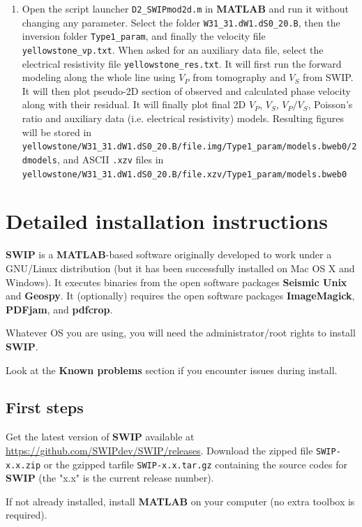 \documentclass[twoside,a4paper]{article}
\def\SWIP{\textbf{SWIP}}
\def\SeismicUnix{\textbf{Seismic Unix}}
\def\Geopsy{\textbf{Geospy}}
\def\ImageMagick{\textbf{ImageMagick}}
\def\PDFjam{\textbf{PDFjam}}
\def\pdfcrop{\textbf{pdfcrop}}
\def\MATLAB{\textbf{MATLAB}}
\begin{document}
\begin{enumerate}[leftmargin=*]
\item Open the script launcher \verb|D2_SWIPmod2d.m| in {\MATLAB} and run it without changing any parameter. Select the folder \verb|W31_31.dW1.dS0_20.B|, then the inversion folder \verb|Type1_param|, and finally the velocity file \verb|yellowstone_vp.txt|. When asked for an auxiliary data file, select the electrical resistivity file \verb|yellowstone_res.txt|. It will first run the forward modeling along the whole line using $V_P$ from tomography and $V_S$ from SWIP. It will then plot pseudo-2D section of observed and calculated phase velocity along with their residual. It will finally plot final 2D $V_P$, $V_S$, $V_P/V_S$, Poisson's ratio and auxiliary data (i.e. electrical resistivity) models. Resulting figures will be stored in \verb|yellowstone/W31_31.dW1.dS0_20.B/file.img/Type1_param/models.bweb0/2dmodels|, and ASCII \verb|.xzv| files in \verb|yellowstone/W31_31.dW1.dS0_20.B/file.xzv/Type1_param/models.bweb0|

\end{enumerate}

\newpage
\section{Detailed installation instructions}
\label{sec:detailedinstruc}
{\SWIP} is a \MATLAB-based software originally developed to work under a GNU/Linux distribution (but it has been successfully installed on Mac OS X and Windows). It executes binaries from the open software packages {\SeismicUnix} and {\Geopsy}. It (optionally) requires the open software packages {\ImageMagick}, {\PDFjam}, and {\pdfcrop}.

Whatever OS you are using, you will need the administrator/root rights to install {\SWIP}.

Look at the \textbf{Known problems} section if you encounter issues during install.

\subsection{First steps}
Get the latest version of {\SWIP} available at \url{https://github.com/SWIPdev/SWIP/releases}. Download the zipped file \verb|SWIP-x.x.zip| or the gzipped tarfile \verb|SWIP-x.x.tar.gz| containing the source codes for {\SWIP} (the "x.x" is the current release number).

If not already installed, install {\MATLAB} on your computer (no extra toolbox is required).
\end{document}
